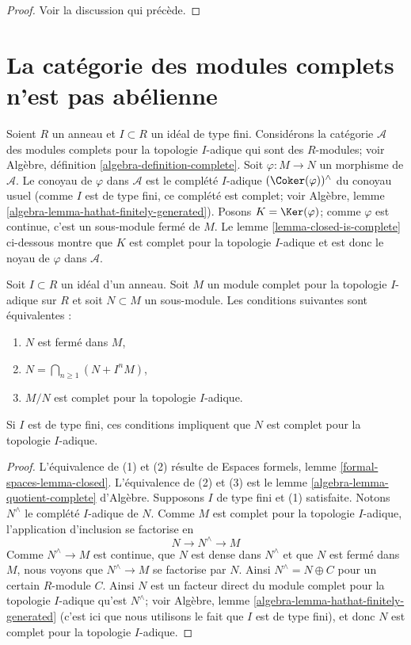 \begin{proof}
Voir la discussion qui précède.
\end{proof}



\section{La catégorie des modules complets n'est pas abélienne}
\label{section-non-abelian}

\noindent
Soient $R$ un anneau et $I \subset R$ un idéal de type fini.
Considérons la catégorie $\mathcal{A}$ des modules complets pour la topologie $I$-adique
qui sont des $R$-modules; voir
Algèbre, définition \ref{algebra-definition-complete}.
Soit $\varphi : M \to N$ un morphisme de $\mathcal{A}$.
Le conoyau de $\varphi$ dans $\mathcal{A}$ est le complété $I$-adique
$(\Coker(\varphi))^\wedge$ du conoyau usuel
(comme $I$ est de type fini, ce complété est complet; voir
Algèbre, lemme \ref{algebra-lemma-hathat-finitely-generated}).
Posons $K = \Ker(\varphi)$; comme $\varphi$ est continue, c'est
un sous-module fermé de $M$. Le lemme \ref{lemma-closed-is-complete}
ci-dessous montre que $K$ est complet pour la topologie $I$-adique et est donc le
noyau de $\varphi$ dans $\mathcal{A}$.

\begin{lemma}
\label{lemma-closed-is-complete}
Soit $I \subset R$ un idéal d'un anneau. Soit $M$ un module complet
pour la topologie $I$-adique sur $R$ et soit $N \subset M$ un sous-module. Les conditions suivantes sont équivalentes :
\begin{enumerate}
\item $N$ est fermé dans $M$,
\item $N = \bigcap_{n \geq 1} (N + I^n M)$,
\item $M/N$ est complet pour la topologie $I$-adique.
\end{enumerate}
Si $I$ est de type fini, ces conditions impliquent que $N$
est complet pour la topologie $I$-adique.
\end{lemma}

\begin{proof}
L'équivalence de (1) et (2) résulte de
Espaces formels, lemme \ref{formal-spaces-lemma-closed}.
L'équivalence de (2) et (3) est le
lemme \ref{algebra-lemma-quotient-complete} d'Algèbre.
Supposons $I$ de type fini et (1) satisfaite.
Notons $N^\wedge$ le complété $I$-adique de $N$. Comme $M$
est complet pour la topologie $I$-adique, l'application d'inclusion se factorise en
$$
N \to N^\wedge \to M
$$
Comme $N^\wedge \to M$ est continue, que $N$ est dense dans $N^\wedge$
et que $N$ est fermé dans $M$, nous voyons que
$N^\wedge \to M$ se factorise par $N$. Ainsi $N^\wedge = N \oplus C$
pour un certain $R$-module $C$. Ainsi $N$ est un facteur direct du
module complet pour la topologie $I$-adique qu'est $N^\wedge$; voir
Algèbre, lemme \ref{algebra-lemma-hathat-finitely-generated}
(c'est ici que nous utilisons le fait que $I$ est de type fini),
et donc $N$ est complet pour la topologie $I$-adique.
\end{proof}

